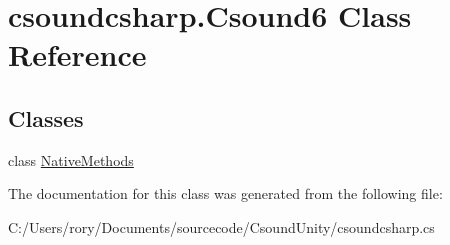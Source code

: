 \hypertarget{classcsoundcsharp_1_1_csound6}{}\section{csoundcsharp.\+Csound6 Class Reference}
\label{classcsoundcsharp_1_1_csound6}
\subsection*{Classes}
\begin{DoxyCompactItemize}
\item 
class \hyperlink{classcsoundcsharp_1_1_csound6_1_1_native_methods}{Native\+Methods}
\end{DoxyCompactItemize}


The documentation for this class was generated from the following file\+:\begin{DoxyCompactItemize}
\item 
C\+:/\+Users/rory/\+Documents/sourcecode/\+Csound\+Unity/csoundcsharp.\+cs\end{DoxyCompactItemize}
